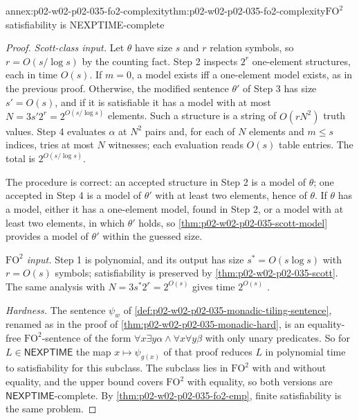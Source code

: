\begin{annexitem}{annex:p02-w02-p02-035-fo2-complexity}{thm:p02-w02-p02-035-fo2-complexity}{\(\mathrm{FO}^2\) satisfiability is NEXPTIME-complete}
\begin{proof}
\emph{Scott-class input.}  Let \(\theta\) have size \(s\) and \(r\) relation
symbols, so \(r=O(s/\log s)\) by the counting fact.  Step 2 inspects
\(2^r\) one-element structures, each in time \(O(s)\).  If \(m=0\), a model
exists iff a one-element model exists, as in the previous proof.  Otherwise,
the modified sentence \(\theta'\) of Step 3 has size \(s'=O(s)\), and if it is
satisfiable it has a model with at most \(N=3s'2^r=2^{O(s/\log s)}\) elements.
Such a structure is a string of \(O(rN^2)\) truth values.  Step 4 evaluates
\(\alpha\) at \(N^2\) pairs and, for each of \(N\) elements and \(m\leq s\)
indices, tries at most \(N\) witnesses; each evaluation reads \(O(s)\) table
entries.  The total is \(2^{O(s/\log s)}\).

The procedure is correct: an accepted structure in Step 2 is a model of
\(\theta\); one accepted in Step 4 is a model of \(\theta'\) with at least two
elements, hence of \(\theta\).  If \(\theta\) has a model, either it has a
one-element model, found in Step 2, or a model with at least two elements, in
which \(\theta'\) holds, so
\cref{thm:p02-w02-p02-035-scott-model} provides a model of \(\theta'\) within
the guessed size.

\emph{\(\mathrm{FO}^2\) input.}  Step 1 is polynomial, and its output has size
\(s^{*}=O(s\log s)\) with \(r=O(s)\) symbols; satisfiability is preserved by
\cref{thm:p02-w02-p02-035-scott}.  The same analysis with
\(N=3s^{*}2^r=2^{O(s)}\) gives time \(2^{O(s)}\)
\cite[thm.~5.3]{GradelKolaitisVardi1997}.

\emph{Hardness.}  The sentence \(\psi_w\) of
\cref{def:p02-w02-p02-035-monadic-tiling-sentence}, renamed as in the proof of
\cref{thm:p02-w02-p02-035-monadic-hard}, is an equality-free
\(\mathrm{FO}^2\)-sentence of the form \(\forall x\exists y\alpha\land\forall
x\forall y\beta\) with only unary predicates.  So for
\(L\in\mathsf{NEXPTIME}\) the map \(x\mapsto\psi_{g(x)}\) of that proof
reduces \(L\) in polynomial time to satisfiability for this subclass.  The
subclass lies in \(\mathrm{FO}^2\) with and without equality, and the upper
bound covers \(\mathrm{FO}^2\) with equality, so both versions are
\(\mathsf{NEXPTIME}\)-complete.  By \cref{thm:p02-w02-p02-035-fo2-emp},
finite satisfiability is the same problem.
\end{proof}
\end{annexitem}

